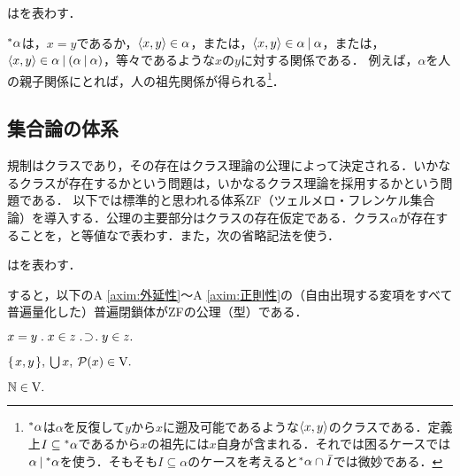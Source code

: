 \begin{df}
\label{df:祖先関係}
\kagi{$
    \ance{\alpha}
$}はを表わす．
\end{df}

\noindent $\ance{\alpha}$は，$x=y$であるか，$\langle x,y \rangle\in\alpha$，または，$\langle x,y \rangle\in\alpha\mathbin{\mid}\alpha$，または，$\langle x,y \rangle\in\alpha\mathbin{\mid}(\alpha\mathbin{\mid}\alpha)$，等々であるような$x$の$y$に対する関係である．
例えば，$\alpha$を人の親子関係にとれば，人の祖先関係が得られる\footnote{
$\ance{\alpha}$は$\alpha$を反復して$y$から$x$に遡及可能であるような$\langle x,y \rangle$のクラスである．定義上$ I\subseteq{^*}\alpha $であるから$x$の祖先には$x$自身が含まれる．それでは困るケースでは$\alpha\mathbin{\mid}{^*}\alpha$を使う．そもそも$I\subseteq\alpha$のケースを考えると${^*}\alpha\cap\bar{I}$では微妙である．}．

\subsection{集合論の体系}
\label{ssec:集合論の体系}

規制はクラスであり，その存在はクラス理論の公理によって決定される．いかなるクラスが存在するかという問題は，いかなるクラス理論を採用するかという問題である．
以下では標準的と思われる体系ZF（ツェルメロ・フレンケル集合論）を導入する．公理の主要部分はクラスの存在仮定である．クラス$\alpha$が存在することを，と等値な\kagi{$ \alpha\in\univ $}で表わす．また，次の省略記法を使う．
\begin{df}[冪集合]
\label{df:冪集合}
はを表わす．
\end{df}

\noindent すると，以下のA \ref{axim:外延性}〜A \ref{axim:正則性}の（自由出現する変項をすべて普遍量化した）普遍閉鎖体がZFの公理（型）である．

\begin{axim}[外延性]
\label{axim:外延性}
$
    x=y\con{1}x\in z\case{1}{1}{1}y\in z.
$
\end{axim}

\begin{axim}[一対化，和，冪]
\label{axim:一対化，和，冪}
$
    \{\mspace{2mu}x,y\mspace{2mu}\},\:{\textstyle\bigcup}\mspace{3mu}x,\:\mathcal{P}(x)\in\mathrm{V}.
$
\end{axim}

\begin{axim}[無限]
\label{axim:無限}
$
    \mathbb{N}\in\mathrm{V}.
$
\end{axim}

